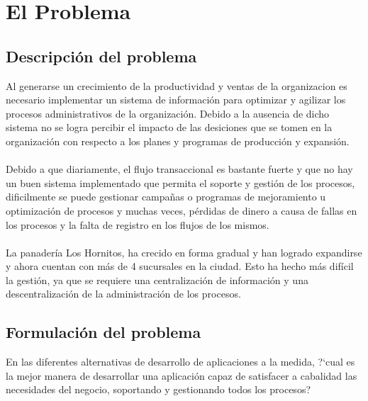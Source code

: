 \chapter{El Problema}\label{Problema}
\section{Descripci\'on del problema}
Al generarse un crecimiento de la productividad y ventas de la organizacion es necesario implementar un sistema de informaci\'on para optimizar y agilizar los procesos administrativos de la organizaci\'on.
Debido a la ausencia de dicho sistema no se logra percibir el impacto de las desiciones que se tomen en la organizaci\'on con respecto a los planes y programas de producci\'on y expansi\'on.%
\\%
\\%
Debido a que diariamente, el flujo transaccional es bastante fuerte y que no hay un buen sistema implementado que permita el soporte y gesti\'on de los procesos, dificilmente se puede gestionar campa\~nas o programas de mejoramiento u optimizaci\'on de procesos y muchas veces, p\'erdidas de dinero a causa de fallas en los procesos y la falta de registro en los flujos de los mismos.%
\\%
\\%
La panader\'ia Los Hornitos, ha crecido en forma gradual y han logrado expandirse y ahora cuentan con m\'as de 4 sucursales en la ciudad. Esto ha hecho m\'as dif\'icil la gesti\'on, ya que se requiere una centralizaci\'on de informaci\'on y una descentralizaci\'on de la administraci\'on de los procesos.%
%
\section{Formulaci\'on del problema}
En las diferentes alternativas de desarrollo de aplicaciones a la medida, ?`cual es la mejor manera de desarrollar una aplicaci\'on capaz de satisfacer a cabalidad las necesidades del negocio, soportando y gestionando todos los procesos?%
%
